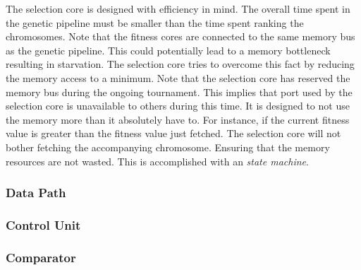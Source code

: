 The selection core is designed with efficiency in mind.
The overall time spent in the genetic pipeline must be smaller than the time spent ranking the chromosomes.
Note that the fitness cores are connected to the same memory bus as the genetic pipeline.
This could potentially lead to a memory bottleneck resulting in starvation.
The selection core tries to overcome this fact by reducing the memory access to a minimum.
Note that the selection core has reserved the memory bus during the ongoing tournament.
This implies that port used by the selection core is unavailable to others during this time.
It is designed to not use the memory more than it absolutely have to.
For instance, if the current fitness value is greater than the fitness value just fetched.
The selection core will not bother fetching the accompanying chromosome.
Ensuring that the memory resources are not wasted.
This is accomplished with an \emph{state machine}. 



\subsubsection{Data Path}











\subsubsection{Control Unit} \label{fpga:selection:sss:control_unit}






\subsubsection {Comparator} \label{fpga:selection:sss:comparator}






